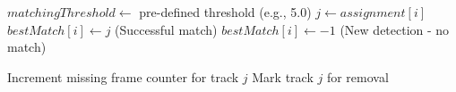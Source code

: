 \documentclass[14pt,a4paper]{article}
\begin{document}
\begin{algorithm}
\begin{algorithmic}[1]
    \State $matchingThreshold \gets$ pre-defined threshold (e.g., 5.0)
        \State $j \gets assignment[i]$
            \State $bestMatch[i] \gets j$ (Successful match)
        \Else
            \State $bestMatch[i] \gets -1$ (New detection - no match)
        \EndIf
    \EndFor
    
            \State Increment missing frame counter for track $j$
                \State Mark track $j$ for removal
            \EndIf
        \EndIf
    \EndFor
    
\EndIf

\end{algorithmic}
\end{algorithm}
\end{document}
